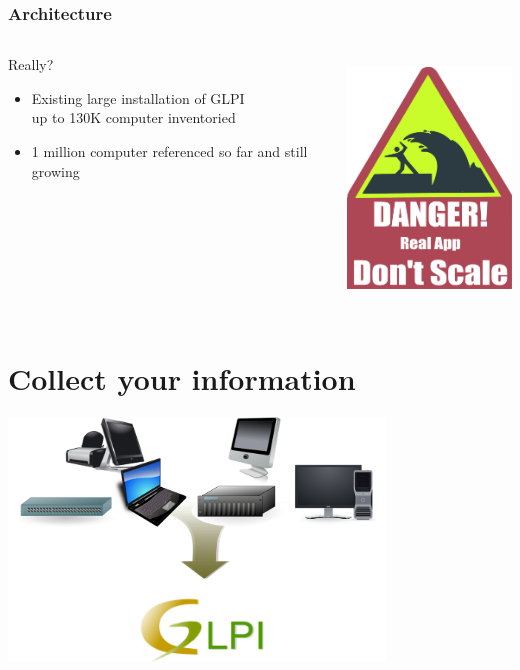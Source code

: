 \documentclass{beamer}
\begin{document}
\begin{frame}
    \frametitle{Architecture}

 \begin{columns}
 \begin{column}{0.34\textwidth}
    \begin{block}{Really?}
        \begin{itemize}
            \item Existing large installation of GLPI \\
            {\small up to 130K computer inventoried}
            \item 1 million computer referenced so far and still growing
        \end{itemize}
    \end{block}

 \end{column}
 \begin{column}{0.90\textwidth}
    \includegraphics[height=6.5cm]{pics/scale.pdf}

 \end{column}
\end{columns}

\end{frame}


\section{Collect your information}

\begin{frame}
\includegraphics[height=6.5cm]{pics/bigpicture.png}
\end{frame}
\end{document}
